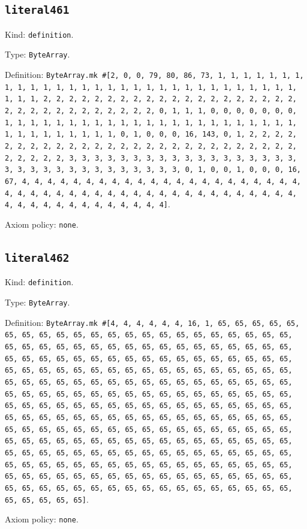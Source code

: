 \documentclass[11pt]{article}
\begin{document}
\subsection*{\texttt{literal461}}
\noindent Kind: \texttt{definition}.\par
\noindent Type: \texttt{ByteArray}.\par
\noindent Definition: \texttt{ByteArray.mk \#[2, 0, 0, 79, 80, 86, 73, 1, 1, 1, 1, 1, 1, 1, 1, 1, 1, 1, 1, 1, 1, 1, 1, 1, 1, 1, 1, 1, 1, 1, 1, 1, 1, 1, 1, 1, 1, 1, 1, 1, 2, 2, 2, 2, 2, 2, 2, 2, 2, 2, 2, 2, 2, 2, 2, 2, 2, 2, 2, 2, 2, 2, 2, 2, 2, 2, 2, 2, 2, 2, 2, 2, 0, 1, 1, 1, 0, 0, 0, 0, 0, 0, 0, 1, 1, 1, 1, 1, 1, 1, 1, 1, 1, 1, 1, 1, 1, 1, 1, 1, 1, 1, 1, 1, 1, 1, 1, 1, 1, 1, 1, 1, 1, 1, 1, 0, 1, 0, 0, 0, 16, 143, 0, 1, 2, 2, 2, 2, 2, 2, 2, 2, 2, 2, 2, 2, 2, 2, 2, 2, 2, 2, 2, 2, 2, 2, 2, 2, 2, 2, 2, 2, 2, 2, 2, 2, 3, 3, 3, 3, 3, 3, 3, 3, 3, 3, 3, 3, 3, 3, 3, 3, 3, 3, 3, 3, 3, 3, 3, 3, 3, 3, 3, 3, 3, 3, 3, 3, 0, 1, 0, 0, 1, 0, 0, 0, 16, 67, 4, 4, 4, 4, 4, 4, 4, 4, 4, 4, 4, 4, 4, 4, 4, 4, 4, 4, 4, 4, 4, 4, 4, 4, 4, 4, 4, 4, 4, 4, 4, 4, 4, 4, 4, 4, 4, 4, 4, 4, 4, 4, 4, 4, 4, 4, 4, 4, 4, 4, 4, 4, 4, 4, 4, 4, 4, 4]}.\par
\noindent Axiom policy: \texttt{none}.\par
\subsection*{\texttt{literal462}}
\noindent Kind: \texttt{definition}.\par
\noindent Type: \texttt{ByteArray}.\par
\noindent Definition: \texttt{ByteArray.mk \#[4, 4, 4, 4, 4, 4, 16, 1, 65, 65, 65, 65, 65, 65, 65, 65, 65, 65, 65, 65, 65, 65, 65, 65, 65, 65, 65, 65, 65, 65, 65, 65, 65, 65, 65, 65, 65, 65, 65, 65, 65, 65, 65, 65, 65, 65, 65, 65, 65, 65, 65, 65, 65, 65, 65, 65, 65, 65, 65, 65, 65, 65, 65, 65, 65, 65, 65, 65, 65, 65, 65, 65, 65, 65, 65, 65, 65, 65, 65, 65, 65, 65, 65, 65, 65, 65, 65, 65, 65, 65, 65, 65, 65, 65, 65, 65, 65, 65, 65, 65, 65, 65, 65, 65, 65, 65, 65, 65, 65, 65, 65, 65, 65, 65, 65, 65, 65, 65, 65, 65, 65, 65, 65, 65, 65, 65, 65, 65, 65, 65, 65, 65, 65, 65, 65, 65, 65, 65, 65, 65, 65, 65, 65, 65, 65, 65, 65, 65, 65, 65, 65, 65, 65, 65, 65, 65, 65, 65, 65, 65, 65, 65, 65, 65, 65, 65, 65, 65, 65, 65, 65, 65, 65, 65, 65, 65, 65, 65, 65, 65, 65, 65, 65, 65, 65, 65, 65, 65, 65, 65, 65, 65, 65, 65, 65, 65, 65, 65, 65, 65, 65, 65, 65, 65, 65, 65, 65, 65, 65, 65, 65, 65, 65, 65, 65, 65, 65, 65, 65, 65, 65, 65, 65, 65, 65, 65, 65, 65, 65, 65, 65, 65, 65, 65, 65, 65, 65, 65, 65, 65, 65, 65, 65, 65, 65, 65, 65, 65, 65, 65, 65, 65, 65, 65, 65, 65]}.\par
\noindent Axiom policy: \texttt{none}.\par
\end{document}
